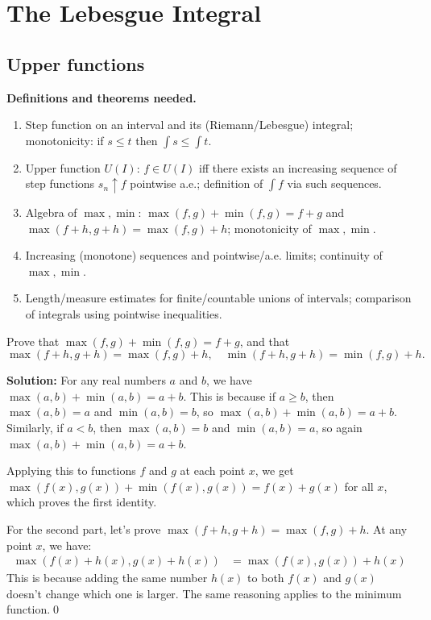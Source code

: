 \chapter{The Lebesgue Integral}

\section{Upper functions}

\noindent\textbf{Definitions and theorems needed.}
\begin{enumerate}[label=(\alph*)]
    \item Step function on an interval and its (Riemann/Lebesgue) integral; monotonicity: if $s\le t$ then $\int s\le\int t$.
    \item Upper function $U(I)$: $f\in U(I)$ iff there exists an increasing sequence of step functions $s_n\uparrow f$ pointwise a.e.; definition of $\int f$ via such sequences.
    \item Algebra of $\max,\min$: $\max(f,g)+\min(f,g)=f+g$ and $\max(f+h,g+h)=\max(f,g)+h$; monotonicity of $\max,\min$.
    \item Increasing (monotone) sequences and pointwise/a.e. limits; continuity of $\max,\min$.
    \item Length/measure estimates for finite/countable unions of intervals; comparison of integrals using pointwise inequalities.
\end{enumerate}



\begin{problembox}
Prove that $\max(f, g) + \min(f, g) = f + g$, and that 
\[ \max(f + h, g + h) = \max(f, g) + h, \quad \min(f + h, g + h) = \min(f, g) + h. \]
\end{problembox}

\bigskip\noindent\textbf{Solution:}
For any real numbers $a$ and $b$, we have $\max(a, b) + \min(a, b) = a + b$. This is because if $a \geq b$, then $\max(a, b) = a$ and $\min(a, b) = b$, so $\max(a, b) + \min(a, b) = a + b$. Similarly, if $a < b$, then $\max(a, b) = b$ and $\min(a, b) = a$, so again $\max(a, b) + \min(a, b) = a + b$.

Applying this to functions $f$ and $g$ at each point $x$, we get $\max(f(x), g(x)) + \min(f(x), g(x)) = f(x) + g(x)$ for all $x$, which proves the first identity.

For the second part, let's prove $\max(f + h, g + h) = \max(f, g) + h$. At any point $x$, we have:
\begin{align*}
\max(f(x) + h(x), g(x) + h(x)) &= \max(f(x), g(x)) + h(x)
\end{align*}
This is because adding the same number $h(x)$ to both $f(x)$ and $g(x)$ doesn't change which one is larger. The same reasoning applies to the minimum function.\qed


